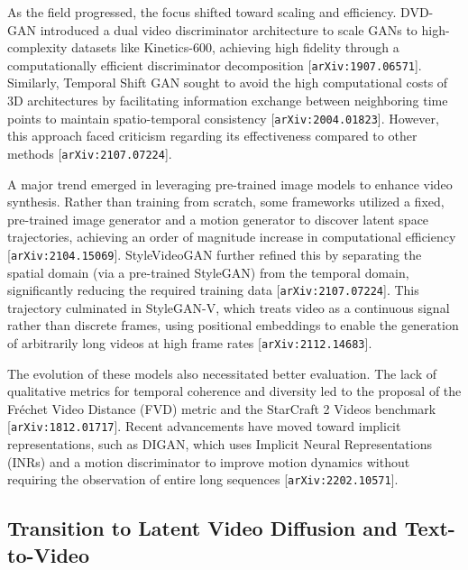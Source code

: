 \documentclass[11pt]{article}
\begin{document}
As the field progressed, the focus shifted toward scaling and efficiency. DVD-GAN introduced a dual video discriminator architecture to scale GANs to high-complexity datasets like Kinetics-600, achieving high fidelity through a computationally efficient discriminator decomposition [\texttt{arXiv:1907.06571}]. Similarly, Temporal Shift GAN sought to avoid the high computational costs of 3D architectures by facilitating information exchange between neighboring time points to maintain spatio-temporal consistency [\texttt{arXiv:2004.01823}]. However, this approach faced criticism regarding its effectiveness compared to other methods [\texttt{arXiv:2107.07224}].

A major trend emerged in leveraging pre-trained image models to enhance video synthesis. Rather than training from scratch, some frameworks utilized a fixed, pre-trained image generator and a motion generator to discover latent space trajectories, achieving an order of magnitude increase in computational efficiency [\texttt{arXiv:2104.15069}]. StyleVideoGAN further refined this by separating the spatial domain (via a pre-trained StyleGAN) from the temporal domain, significantly reducing the required training data [\texttt{arXiv:2107.07224}]. This trajectory culminated in StyleGAN-V, which treats video as a continuous signal rather than discrete frames, using positional embeddings to enable the generation of arbitrarily long videos at high frame rates [\texttt{arXiv:2112.14683}].

The evolution of these models also necessitated better evaluation. The lack of qualitative metrics for temporal coherence and diversity led to the proposal of the Fréchet Video Distance (FVD) metric and the StarCraft 2 Videos benchmark [\texttt{arXiv:1812.01717}]. Recent advancements have moved toward implicit representations, such as DIGAN, which uses Implicit Neural Representations (INRs) and a motion discriminator to improve motion dynamics without requiring the observation of entire long sequences [\texttt{arXiv:2202.10571}].

\subsection{Transition to Latent Video Diffusion and Text-to-Video}
\end{document}
